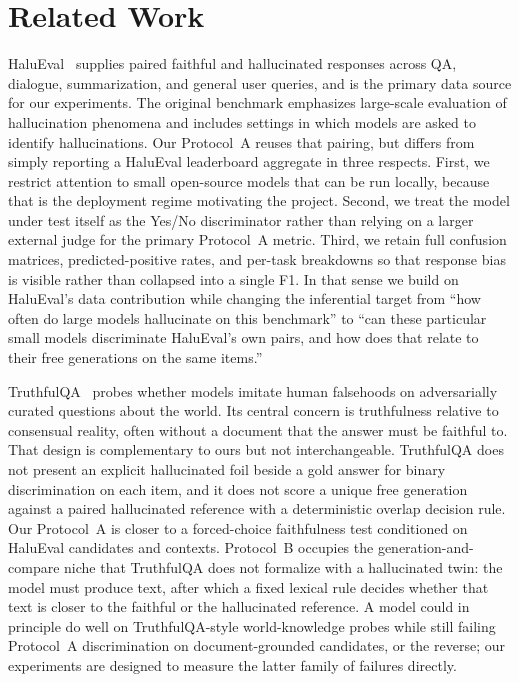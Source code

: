 \documentclass[11pt]{article}
\begin{document}
\section{Related Work}

HaluEval~\cite{halueval} supplies paired faithful and hallucinated responses
across QA, dialogue, summarization, and general user queries, and is the primary
data source for our experiments. The original benchmark emphasizes large-scale
evaluation of hallucination phenomena and includes settings in which models are
asked to identify hallucinations. Our Protocol~A reuses that pairing, but
differs from simply reporting a HaluEval leaderboard aggregate in three respects.
First, we restrict attention to small open-source models that can be run locally,
because that is the deployment regime motivating the project. Second, we treat
the model under test itself as the Yes/No discriminator rather than relying on a
larger external judge for the primary Protocol~A metric. Third, we retain full
confusion matrices, predicted-positive rates, and per-task breakdowns so that
response bias is visible rather than collapsed into a single F1. In that sense
we build on HaluEval's data contribution while changing the inferential target
from ``how often do large models hallucinate on this benchmark'' to ``can these
particular small models discriminate HaluEval's own pairs, and how does that
relate to their free generations on the same items.''

TruthfulQA~\cite{truthfulqa} probes whether models imitate human falsehoods on
adversarially curated questions about the world. Its central concern is
truthfulness relative to consensual reality, often without a document that the
answer must be faithful to. That design is complementary to ours but not
interchangeable. TruthfulQA does not present an explicit hallucinated foil beside
a gold answer for binary discrimination on each item, and it does not score a
unique free generation against a paired hallucinated reference with a
deterministic overlap decision rule. Our Protocol~A is closer to a forced-choice
faithfulness test conditioned on HaluEval candidates and contexts. Protocol~B
occupies the generation-and-compare niche that TruthfulQA does not formalize with
a hallucinated twin: the model must produce text, after which a fixed lexical
rule decides whether that text is closer to the faithful or the hallucinated
reference. A model could in principle do well on TruthfulQA-style world-knowledge
probes while still failing Protocol~A discrimination on document-grounded
candidates, or the reverse; our experiments are designed to measure the latter
family of failures directly.
\end{document}
